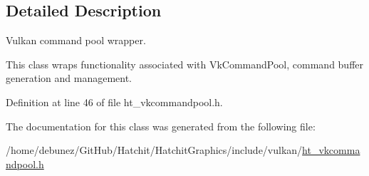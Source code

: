 \subsection{Detailed Description}
Vulkan command pool wrapper. 

This class wraps functionality associated with Vk\+Command\+Pool, command buffer generation and management. 

Definition at line 46 of file ht\+\_\+vkcommandpool.\+h.



The documentation for this class was generated from the following file\+:\begin{DoxyCompactItemize}
\item 
/home/debunez/\+Git\+Hub/\+Hatchit/\+Hatchit\+Graphics/include/vulkan/\hyperlink{ht__vkcommandpool_8h}{ht\+\_\+vkcommandpool.\+h}\end{DoxyCompactItemize}
